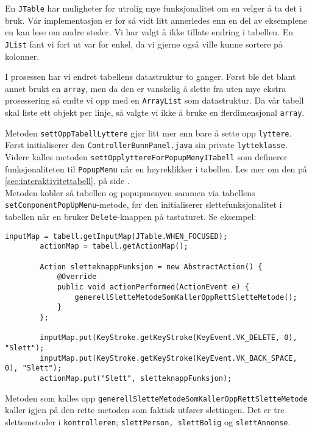 En \texttt{JTable} har muligheter for utrolig mye funksjonalitet om en velger å ta det i bruk.
Vår implementasjon er for så vidt litt annerledes enn en del av eksemplene en kan lese om andre steder. Vi har valgt å ikke tillate endring i tabellen. En \texttt{JList} fant vi fort ut var for enkel, da vi gjerne også ville kunne sortere på kolonner.

I prosessen har vi endret tabellens datastruktur to ganger. Først ble det blant annet brukt en \texttt{array}, men da den er vanskelig å slette fra uten mye ekstra prosessering så endte vi opp med en \texttt{ArrayList} som datastruktur. Da vår tabell skal liste ett objekt per linje, så valgte vi ikke å bruke en flerdimensjonal \texttt{array}. 

Metoden \texttt{settOppTabellLyttere} gjør litt mer enn bare å sette opp \texttt{lyttere}. Først initialiserer den \texttt{ControllerBunnPanel.java} sin private \texttt{lytteklasse}. \\
Videre kalles metoden \texttt{settOpplyttereForPopupMenyITabell} som definerer funksjonaliteten til \texttt{PopupMenu} når en høyreklikker i tabellen. Les mer om den på \ref{sec:interaktivitettabell}, på side \pageref{sec:interaktivitettabell}. \\
Metoden kobler så tabellen og popupmenyen sammen via tabellens \texttt{setComponentPopUpMenu}-metode, før den initialiserer slettefunksjonalitet i tabellen når en bruker \texttt{Delete}-knappen på tastaturet. Se eksempel:


\begin{lstlisting}[caption=Slettefunksjonalitet i tabellen ved å trykke Delete på tastaturet]
        inputMap = tabell.getInputMap(JTable.WHEN_FOCUSED);
        actionMap = tabell.getActionMap();

        Action sletteknappFunksjon = new AbstractAction() {
            @Override
            public void actionPerformed(ActionEvent e) {
                generellSletteMetodeSomKallerOppRettSletteMetode();
            }
        };

        inputMap.put(KeyStroke.getKeyStroke(KeyEvent.VK_DELETE, 0), "Slett");
        inputMap.put(KeyStroke.getKeyStroke(KeyEvent.VK_BACK_SPACE, 0), "Slett");
        actionMap.put("Slett", sletteknappFunksjon);
\end{lstlisting}


Metoden som kalles opp \texttt{generellSletteMetodeSomKallerOppRettSletteMetode} kaller igjen på den rette metoden som faktisk utfører slettingen. Det er tre slettemetoder i \texttt{kontrolleren}; \texttt{slettPerson, slettBolig} og \texttt{slettAnnonse}.


